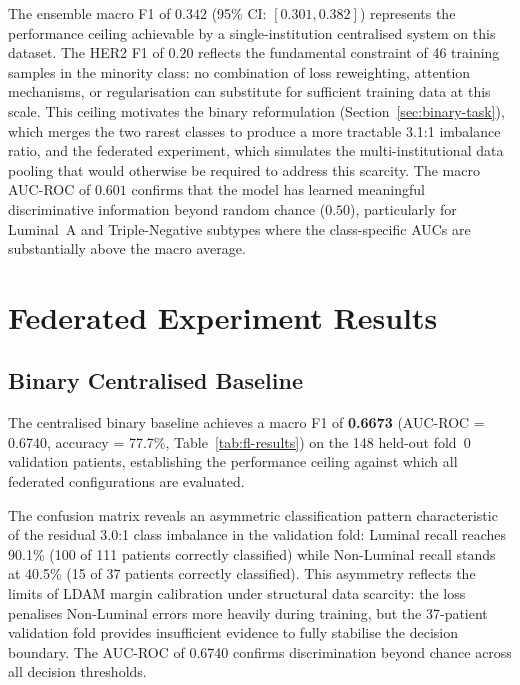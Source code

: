 The ensemble macro F1 of $0.342$ (95\% CI: $[0.301,
0.382]$) represents the performance ceiling achievable
by a single-institution centralised system on this
dataset.
The HER2 F1 of $0.20$ reflects the fundamental constraint
of 46 training samples in the minority class: no
combination of loss reweighting, attention mechanisms,
or regularisation can substitute for sufficient training
data at this scale.
This ceiling motivates the binary reformulation
(Section~\ref{sec:binary-task}), which merges the two
rarest classes to produce a more tractable 3.1:1 imbalance
ratio, and the federated experiment, which simulates the
multi-institutional data pooling that would otherwise be
required to address this scarcity.
The macro AUC-ROC of $0.601$ confirms that the model
has learned meaningful discriminative information beyond
random chance ($0.50$), particularly for Luminal~A and
Triple-Negative subtypes where the class-specific AUCs
are substantially above the macro average.


\section{Federated Experiment Results}
\label{sec:fl-results}

\subsection{Binary Centralised Baseline}
\label{sec:binary-baseline}

The centralised binary baseline achieves a macro F1 of
\textbf{0.6673} (AUC-ROC = 0.6740, accuracy = 77.7\%,
Table~\ref{tab:fl-results}) on the 148 held-out fold~0
validation patients, establishing the performance ceiling
against which all federated configurations are evaluated.

The confusion matrix reveals an asymmetric classification
pattern characteristic of the residual 3.0:1 class imbalance
in the validation fold: Luminal recall reaches 90.1\%
(100 of 111 patients correctly classified) while Non-Luminal
recall stands at 40.5\% (15 of 37 patients correctly
classified).
This asymmetry reflects the limits of LDAM margin calibration
under structural data scarcity: the loss penalises Non-Luminal
errors more heavily during training, but the 37-patient
validation fold provides insufficient evidence to fully
stabilise the decision boundary.
The AUC-ROC of 0.6740 confirms discrimination beyond
chance across all decision thresholds.

